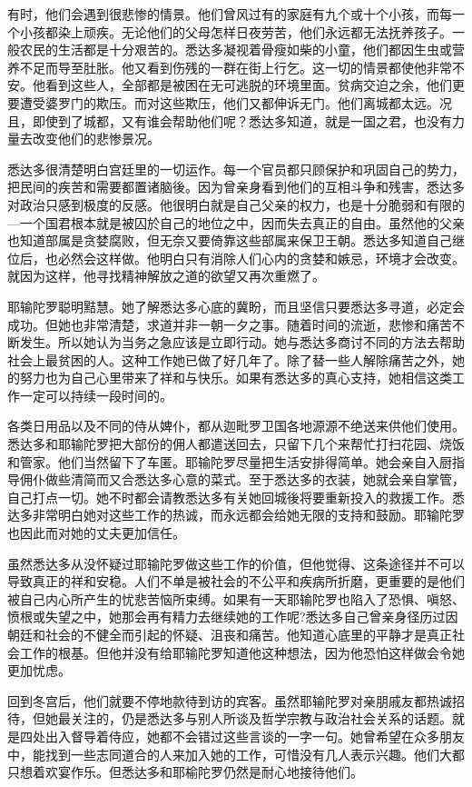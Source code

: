 \documentclass[12pt,twoside,openany]{book}
\begin{document}
有时，他们会遇到很悲惨的情景。他们曾风过有的家庭有九个或十个小孩，而每一个小孩都染上顽疾。无论他们的父母怎样日夜劳苦，他们永远都无法抚养孩子。一般农民的生活都是十分艰苦的。悉达多凝视着骨瘦如柴的小童，他们都因生虫或营养不足而导至肚胀。他又看到伤残的一群在街上行乞。这一切的情景都使他非常不安。他看到这些人，全部都是被困在无可逃脱的环境里面。贫病交迫之余，他们更要遭受婆罗门的欺压。而对这些欺压，他们又都伸诉无门。他们离城都太远。况且，即使到了城都，又有谁会帮助他们呢？悉达多知道，就是一国之君，也没有力量去改变他们的悲惨景况。

悉达多很清楚明白宫廷里的一切运作。每一个官员都只顾保护和巩固自己的势力，把民间的疾苦和需要都置诸脑後。因为曾亲身看到他们的互相斗争和残害，悉达多对政治只感到极度的反感。他很明白就是自己父亲的权力，也是十分脆弱和有限的—一个国君根本就是被囚於自己的地位之中，因而失去真正的自由。虽然他的父亲也知道部属是贪婪腐败，但无奈又要倚靠这些部属来保卫王朝。悉达多知道自己继位后，也必然会这样做。他明白只有消除人们心内的贪婪和嫉忌，环境才会改变。就因为这样，他寻找精神解放之道的欲望又再次重燃了。

耶输陀罗聪明黠慧。她了解悉达多心底的冀盼，而且坚信只要悉达多寻道，必定会成功。但她也非常清楚，求道并非一朝一夕之事。随着时间的流逝，悲惨和痛苦不断发生。所以她认为当务之急应该是立即行动。她与悉达多商讨不同的方法去帮助社会上最贫困的人。这种工作她已做了好几年了。除了替一些人解除痛苦之外，她的努力也为自己心里带来了祥和与快乐。如果有悉达多的真心支持，她相信这类工作一定可以持续一段时间的。

各类日用品以及不同的侍从婢仆，都从迦毗罗卫国各地源源不绝送来供他们使用。悉达多和耶输陀罗把大部份的佣人都遣送回去，只留下几个来帮忙打扫花园、烧饭和管家。他们当然留下了车匿。耶输陀罗尽量把生活安排得简单。她会亲自入厨指导佣仆做些清简而又合悉达多心意的菜式。至于悉达多的衣装，她就会亲自掌管，自己打点一切。她不时都会请教悉达多有关她回城後将要重新投入的救援工作。悉达多非常明白她对这些工作的热诚，而永远都会给她无限的支持和鼓励。耶输陀罗也因此而对她的丈夫更加信任。

虽然悉达多从没怀疑过耶输陀罗做这些工作的价值，但他觉得、这条途径并不可以导致真正的祥和安稳。人们不单是被社会的不公平和疾病所折磨，更重要的是他们被自己内心所产生的忧悲苦恼所束缚。如果有一天耶输陀罗也陷入了恐惧、嗔怒、愤根或失望之中，她那会再有精力去继续她的工作呢?悉达多自己曾亲身径历过因朝廷和社会的不健全而引起的怀疑、沮丧和痛苦。他知道心底里的平静才是真正社会工作的根基。但他并没有给耶输陀罗知道他这种想法，因为他恐怕这样做会令她更加忧虑。

回到冬宫后，他们就要不停地款待到访的宾客。虽然耶输陀罗对亲朋戚友都热诚招待，但她最关注的，仍是悉达多与别人所谈及哲学宗教与政治社会关系的话题。就是四处出入督导着侍应，她都不会错过这些言谈的一字一句。她曾希望在众多朋友中，能找到一些志同道合的人来加入她的工作，可惜没有几人表示兴趣。他们大都只想着欢宴作乐。但悉达多和耶榆陀罗仍然是耐心地接待他们。
\end{document}
